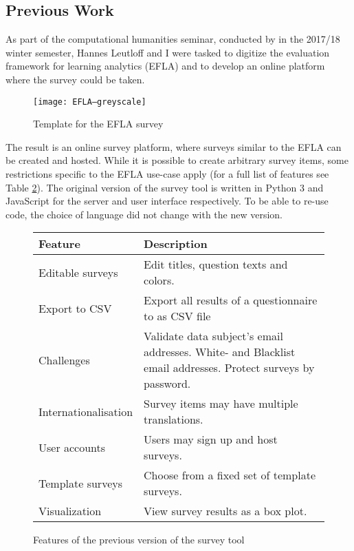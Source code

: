 \subsection{Previous Work}
    As part of the computational humanities seminar, conducted by \profhd in the 2017/18 winter semester, Hannes Leutloff
    and I were tasked to digitize the evaluation framework for learning analytics (EFLA) \cite{efla} and to
    develop an online platform where the survey could be taken.

    \begin{figure}
        \centering
        \texttt{[image: EFLA--greyscale]}
        \caption{Template for the EFLA survey \cite{efla-website}}
        \label{fig:efla-template}
    \end{figure}

   The result is an online survey platform, where surveys similar to the EFLA can be created
   and hosted. While it is possible to create arbitrary survey items, some restrictions
   specific to the EFLA use-case apply (for a full list of features see Table \ref{table:v1-features}).
   The original version of the survey tool is written in Python 3 and JavaScript for the server
   and user interface respectively. To be able to re-use code, the choice of language did not
   change with the new version.
   

   \begin{figure}
       \begin{tabularx}{\textwidth}{|l|X|}
            \hline
            Feature & Description \\
            \hline \hline
            Editable surveys & Edit titles, question texts and colors.\\
            Export to CSV & Export all results of a questionnaire to as CSV file\\
            Challenges & Validate data subject's email addresses. 
            White- and Blacklist email addresses. Protect surveys by password.\\
            Internationalisation & Survey items may have multiple translations.\\
            User accounts & Users may sign up and host surveys.\\
            Template surveys & Choose from a fixed set of template surveys.\\
            Visualization & View survey results as a box plot.\\
            \hline
       \end{tabularx}
       \caption{Features of the previous version of the survey tool}
       \label{table:v1-features}
   \end{figure}

